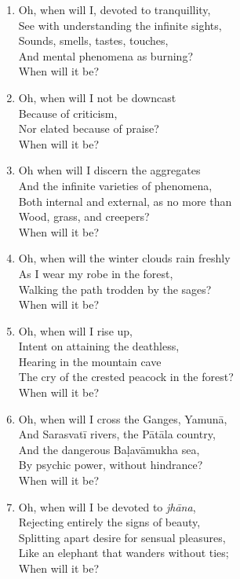 \documentclass[10pt, openany]{book}
\begin{document}
\begin{enumerate}
\item Oh, when will I, devoted to tranquillity,\\
See with understanding the infinite sights,\\
Sounds, smells, tastes, touches, \\
And mental phenomena as burning? \\
When will it be?

\item Oh, when will I not be downcast\\
Because of criticism,\\
Nor elated because of praise?\\
When will it be?

\item Oh when will I discern the aggregates\\
And the infinite varieties of phenomena,\\
Both internal and external, as no more than\\
Wood, grass, and creepers? \\
When will it be?

\item Oh, when will the winter clouds rain freshly\\
As I wear my robe in the forest,\\
Walking the path trodden by the sages?\\
When will it be?

\item Oh, when will I rise up, \\
Intent on attaining the deathless,\\
Hearing in the mountain cave\\
The cry of the crested peacock in the forest?\\
When will it be?

\item Oh, when will I cross the Ganges, Yamunā,\\
And Sarasvatī rivers, the Pātāla country,\\
And the dangerous Baḷavāmukha sea,\\
By psychic power, without hindrance? \\
When will it be?

\item Oh, when will I be devoted to \emph{jhāna},\\
Rejecting entirely the signs of beauty,\\
Splitting apart desire for sensual pleasures,\\
Like an elephant that wanders without ties;\\
When will it be?


\end{enumerate}
\end{document}

